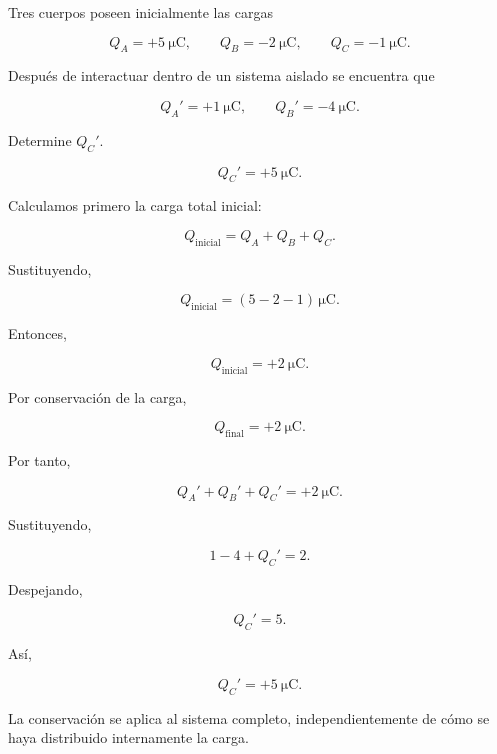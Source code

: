
\begin{ejercicio}

Tres cuerpos poseen inicialmente las cargas

\[
Q_A=+\SI{5}{\micro\coulomb},
\qquad
Q_B=-\SI{2}{\micro\coulomb},
\qquad
Q_C=-\SI{1}{\micro\coulomb}.
\]

Después de interactuar dentro de un sistema aislado se encuentra que

\[
Q_A'=+\SI{1}{\micro\coulomb},
\qquad
Q_B'=-\SI{4}{\micro\coulomb}.
\]

Determine \(Q_C'\).

\end{ejercicio}

\begin{respuesta}

\[
\boxed{
Q_C'=+\SI{5}{\micro\coulomb}
}.
\]

\end{respuesta}

\begin{explicacion}

Calculamos primero la carga total inicial:

\[
Q_{\text{inicial}}
=
Q_A+Q_B+Q_C.
\]

Sustituyendo,

\[
Q_{\text{inicial}}
=
(5-2-1)\,\si{\micro\coulomb}.
\]

Entonces,

\[
Q_{\text{inicial}}
=
+\SI{2}{\micro\coulomb}.
\]

Por conservación de la carga,

\[
Q_{\text{final}}
=
+\SI{2}{\micro\coulomb}.
\]

Por tanto,

\[
Q_A'+Q_B'+Q_C'
=
+\SI{2}{\micro\coulomb}.
\]

Sustituyendo,

\[
1-4+Q_C'=2.
\]

Despejando,

\[
Q_C'=5.
\]

Así,

\[
\boxed{
Q_C'=+\SI{5}{\micro\coulomb}
}.
\]

La conservación se aplica al sistema completo, independientemente de cómo se
haya distribuido internamente la carga.

\end{explicacion}


